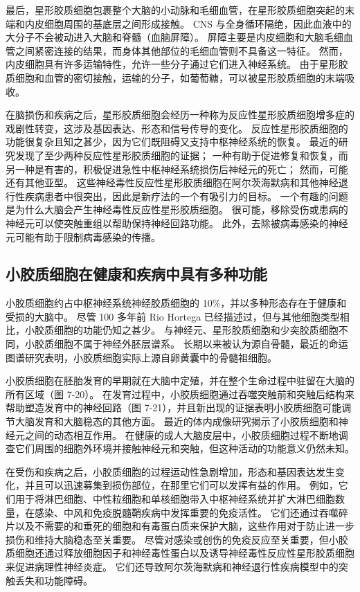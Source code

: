 最后，星形胶质细胞包裹整个大脑的小动脉和毛细血管，在星形胶质细胞突起的末端和内皮细胞周围的基底层之间形成接触。
CNS 与全身循环隔绝，因此血液中的大分子不会被动进入大脑和脊髓（血脑屏障）。
屏障主要是内皮细胞和大脑毛细血管之间紧密连接的结果，而身体其他部位的毛细血管则不具备这一特征。
然而，内皮细胞具有许多运输特性，允许一些分子通过它们进入神经系统。
由于星形胶质细胞和血管的密切接触，运输的分子，如葡萄糖，可以被星形胶质细胞的末端吸收。


在脑损伤和疾病之后，星形胶质细胞会经历一种称为反应性星形胶质细胞增多症的戏剧性转变，这涉及基因表达、形态和信号传导的变化。
反应性星形胶质细胞的功能很复杂且知之甚少，因为它们既阻碍又支持中枢神经系统的恢复。
最近的研究发现了至少两种反应性星形胶质细胞的证据； 一种有助于促进修复和恢复，而另一种是有害的，积极促进急性中枢神经系统损伤后神经元的死亡； 然而，可能还有其他亚型。
这些神经毒性反应性星形胶质细胞在阿尔茨海默病和其他神经退行性疾病患者中很突出，因此是新疗法的一个有吸引力的目标。
一个有趣的问题是为什么大脑会产生神经毒性反应性星形胶质细胞。
很可能，移除受伤或患病的神经元可以使突触重组以帮助保持神经回路功能。
此外，去除被病毒感染的神经元可能有助于限制病毒感染的传播。


\subsection{小胶质细胞在健康和疾病中具有多种功能}

小胶质细胞约占中枢神经系统神经胶质细胞的 10\%，并以多种形态存在于健康和受损的大脑中。
尽管 100 多年前 Rio Hortega 已经描述过，但与其他细胞类型相比，小胶质细胞的功能仍知之甚少。
与神经元、星形胶质细胞和少突胶质细胞不同，小胶质细胞不属于神经外胚层谱系。
长期以来被认为源自骨髓，最近的命运图谱研究表明，小胶质细胞实际上源自卵黄囊中的骨髓祖细胞。


小胶质细胞在胚胎发育的早期就在大脑中定殖，并在整个生命过程中驻留在大脑的所有区域（图 7-20）。
在发育过程中，小胶质细胞通过吞噬突触前和突触后结构来帮助塑造发育中的神经回路（图 7-21），并且新出现的证据表明小胶质细胞可能调节大脑发育和大脑稳态的其他方面。
最近的体内成像研究揭示了小胶质细胞和神经元之间的动态相互作用。
在健康的成人大脑皮层中，小胶质细胞过程不断地调查它们周围的细胞外环境并接触神经元和突触，但这种活动的功能意义仍然未知。


在受伤和疾病之后，小胶质细胞的过程运动性急剧增加，形态和基因表达发生变化，并且可以迅速募集到损伤部位，在那里它们可以发挥有益的作用。
例如，它们用于将淋巴细胞、中性粒细胞和单核细胞带入中枢神经系统并扩大淋巴细胞数量，在感染、中风和免疫脱髓鞘疾病中发挥重要的免疫活性。
它们还通过吞噬碎片以及不需要的和垂死的细胞和有毒蛋白质来保护大脑，这些作用对于防止进一步损伤和维持大脑稳态至关重要。
尽管对感染或创伤的免疫反应至关重要，但小胶质细胞还通过释放细胞因子和神经毒性蛋白以及诱导神经毒性反应性星形胶质细胞来促进病理性神经炎症。
它们还导致阿尔茨海默病和神经退行性疾病模型中的突触丢失和功能障碍。



